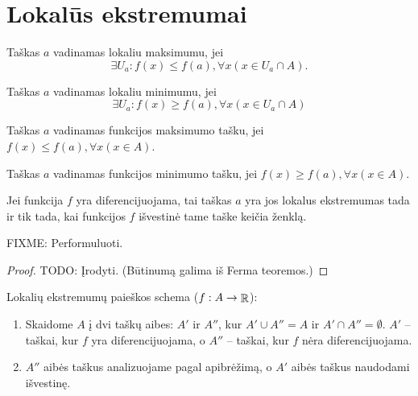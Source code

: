 \section{Lokalūs ekstremumai}

\begin{defn}
  Taškas $a$ vadinamas lokaliu maksimumu, jei
  \begin{equation*}
    \exists U_{a} : f(x) \leq f(a), \forall x (x \in U_{a} \cap A).
  \end{equation*}
\end{defn}

\begin{defn}
  Taškas $a$ vadinamas lokaliu minimumu, jei
  \begin{equation*}
    \exists U_{a} : f(x) \geq f(a), \forall x (x \in U_{a} \cap A)
  \end{equation*}
\end{defn}

\begin{defn}
  Taškas $a$ vadinamas funkcijos maksimumo tašku, jei 
  $f(x) \leq f(a), \forall x (x \in A)$.
\end{defn}

\begin{defn}
  Taškas $a$ vadinamas funkcijos minimumo tašku, jei
  $f(x) \geq f(a), \forall x (x \in A)$.
\end{defn}

\begin{prop}
  Jei funkcija $f$ yra diferencijuojama, tai taškas $a$ yra jos
  lokalus ekstremumas tada ir tik tada, kai funkcijos $f$ išvestinė
  tame taške keičia ženklą.

  FIXME: Performuluoti.
  \begin{proof}
    TODO: Įrodyti. (Būtinumą galima iš Ferma teoremos.)
  \end{proof}
\end{prop}

Lokalių ekstremumų paieškos schema ($f : A \to \mathop{\mathbb{R}}$):
\begin{enumerate}
  \item Skaidome $A$ į dvi taškų aibes: $A'$ ir $A''$, kur
    $A' \cup A'' = A$ ir
    $A' \cap A'' = \emptyset$.
    $A'$ – taškai, kur $f$ yra diferencijuojama, o 
    $A''$ – taškai, kur $f$ nėra diferencijuojama.
  \item $A''$ aibės taškus analizuojame pagal apibrėžimą, o 
    $A'$ aibės taškus naudodami išvestinę.
\end{enumerate}
